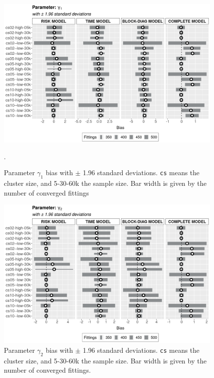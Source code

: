 \documentclass[a4paper,12pt]{article}
\begin{document}
\vspace{-0.514cm}
\begin{figure}[H]
 \centering
 \includegraphics[width=\linewidth]{pics/bias2plotsd-3.png}
 \vspace{-0.75cm}
 \caption{Parameter \(\gamma_{1}\) bias with \(\pm\) 1.96 standard
   deviations. \texttt{cs} means the cluster size, and 5-30-60k the
   sample size. Bar width is given by the number of converged fittings}.
 \label{fig:biassdgama1}
\end{figure}

\begin{figure}[H]
 \centering
 \includegraphics[width=\linewidth]{pics/bias2plotsd-4.png}
 \vspace{-0.75cm}
 \caption{Parameter \(\gamma_{2}\) bias with \(\pm\) 1.96 standard
   deviations. \texttt{cs} means the cluster size, and 5-30-60k the
   sample size. Bar width is given by the number of converged fittings.}
 \label{fig:biassdgama2}
\end{figure}
\end{document}
